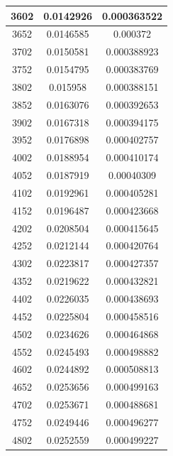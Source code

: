 \documentclass{article}
\begin{document}
\begin{longtable}{|c|c|c|}
		3602	&  0.0142926  	 &  0.000363522  \\ \hline                  
		3652	&  0.0146585  	 &  0.000372     \\ \hline               
		3702	&  0.0150581  	 &  0.000388923  \\ \hline                  
		3752	&  0.0154795  	 &  0.000383769  \\ \hline                  
		3802	&  0.015958   	 &  0.000388151  \\ \hline                  
		3852	&  0.0163076  	 &  0.000392653  \\ \hline                  
		3902	&  0.0167318  	 &  0.000394175  \\ \hline                  
		3952	&  0.0176898  	 &  0.000402757  \\ \hline                  
		4002	&  0.0188954  	 &  0.000410174  \\ \hline                  
		4052	&  0.0187919  	 &  0.00040309   \\ \hline                 
		4102	&  0.0192961  	 &  0.000405281  \\ \hline                  
		4152	&  0.0196487  	 &  0.000423668  \\ \hline                  
		4202	&  0.0208504  	 &  0.000415645  \\ \hline                  
		4252	&  0.0212144  	 &  0.000420764  \\ \hline                  
		4302	&  0.0223817  	 &  0.000427357  \\ \hline                  
		4352	&  0.0219622  	 &  0.000432821  \\ \hline                  
		4402	&  0.0226035  	 &  0.000438693  \\ \hline                  
		4452	&  0.0225804  	 &  0.000458516  \\ \hline                  
		4502	&  0.0234626  	 &  0.000464868  \\ \hline                  
		4552	&  0.0245493  	 &  0.000498882  \\ \hline                  
		4602	&  0.0244892  	 &  0.000508813  \\ \hline                  
		4652	&  0.0253656  	 &  0.000499163  \\ \hline                  
		4702	&  0.0253671  	 &  0.000488681  \\ \hline                  
		4752	&  0.0249446  	 &  0.000496277  \\ \hline                  
		4802	&  0.0252559  	 &  0.000499227  \\ \hline                  

\end{longtable}
\end{document}
